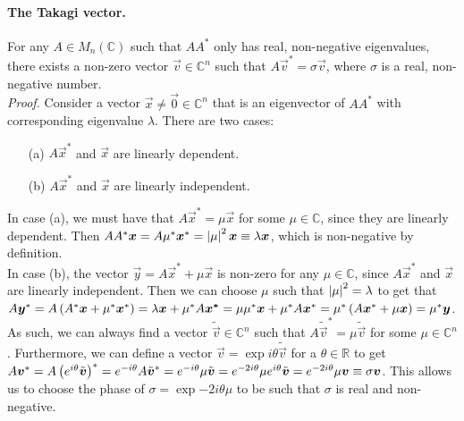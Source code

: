 \documentclass[../main.tex]{subfiles}
\begin{document}
\paragraph{The Takagi vector.}
For any \(A \in M_{n}(\mathbb{C})\) such that \(AA^\ast\) only has real, non-negative eigenvalues, there exists a non-zero vector \(\vec{v} \in \mathbb{C}^n\) such that \(A \vec{v}^* = \sigma \vec{v}\), where \(\sigma\) is a real, non-negative number.\\
\emph{Proof.} Consider a vector \(\vec{x} \neq \vec{0} \in \mathbb{C}^n\) that is an eigenvector of \(AA^\ast\) with corresponding eigenvalue \(\lambda\).
There are two cases:
\begin{itemize}
  \item[(a)] \(A\vec{x}^*\) and \(\vec{x}\) are linearly dependent.
  \item[(b)] \(A\vec{x}^*\) and \(\vec{x}\) are linearly independent.
\end{itemize}
In case (a), we must have that \(A\vec{x}^* = \mu \vec{x}\) for some \(\mu \in \mathbb{C}\), since they are linearly dependent.
Then \(AA^\ast \boldsymbol{x} = A \mu^\ast \boldsymbol{x}^* = \left|\mu\right|^2 \boldsymbol{x} \equiv \lambda \boldsymbol{x}\), which is non-negative by definition.\\
In case (b), the vector \(\vec{y} = A\vec{x}^* + \mu \vec{x}\) is non-zero for any \(\mu \in \mathbb{C}\), since \(A\vec{x}^*\) and \(\vec{x}\) are linearly independent.
Then we can choose \(\mu\) such that \(\left|\mu\right|^2 = \lambda\) to get that \(A \boldsymbol{y}^* = A\left(A^\ast \boldsymbol{x} + \mu^\ast \boldsymbol{x}^*\right) = \lambda\boldsymbol{x} + \mu^\ast A\boldsymbol{x^*} = \mu\mu^\ast \boldsymbol{x} + \mu^\ast A\boldsymbol{x}^* = \mu^\ast \left(A \boldsymbol{x}^* + \mu \boldsymbol{x}\right) = \mu^\ast \boldsymbol{y}\).\\
As such, we can always find a vector \(\tilde{\vec{v}} \in \mathbb{C}^n\) such that \(A \tilde{\vec{v}}^* = \mu \tilde{\vec{v}}\) for some \(\mu \in \mathbb{C}^n\).
Furthermore, we can define a vector \(\vec{v} = \exp{i\theta} \tilde{\vec{v}}\) for a \(\theta \in \mathbb{R}\) to get \(A\boldsymbol{v}^* = A \left(e^{i\theta} \tilde{\boldsymbol{v}}\right)^\ast = e^{-i\theta} A\tilde{\boldsymbol{v}}^* = e^{-i\theta} \mu \tilde{\boldsymbol{v}} = e^{-2i\theta} \mu e^{i\theta} \tilde{\boldsymbol{v}} = e^{-2i\theta} \mu \boldsymbol{v} \equiv \sigma \boldsymbol{v}\).
This allows us to choose the phase of \(\sigma = \exp{-2i\theta} \mu\) to be such that \(\sigma\) is real and non-negative.
\medskip
\end{document}
